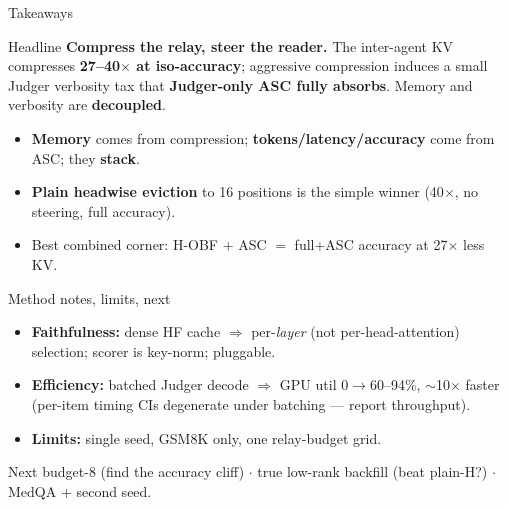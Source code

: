 \documentclass{beamer}
\begin{document}
\begin{frame}{Takeaways}
    \begin{block}{Headline}
        \textbf{Compress the relay, steer the reader.} The inter-agent KV compresses \textbf{27--40$\times$ at iso-accuracy}; aggressive compression induces a small Judger verbosity tax that \textbf{Judger-only ASC fully absorbs}. Memory and verbosity are \textbf{decoupled}.
    \end{block}
    \begin{itemize}
        \item \textbf{Memory} comes from compression; \textbf{tokens/latency/accuracy} come from ASC; they \textbf{stack}.
        \item \textbf{Plain headwise eviction} to 16 positions is the simple winner (40$\times$, no steering, full accuracy).
        \item Best combined corner: H-OBF + ASC $=$ full+ASC accuracy at 27$\times$ less KV.
    \end{itemize}
\end{frame}

\begin{frame}{Method notes, limits, next}
    \begin{itemize}
        \item \textbf{Faithfulness:} dense HF cache $\Rightarrow$ per-\emph{layer} (not per-head-attention) selection; scorer is key-norm; pluggable.
        \item \textbf{Efficiency:} batched Judger decode $\Rightarrow$ GPU util $0 \to 60$--94\%, $\sim$10$\times$ faster (per-item timing CIs degenerate under batching --- report throughput).
        \item \textbf{Limits:} single seed, GSM8K only, one relay-budget grid.
    \end{itemize}
    \vspace{0.2cm}
    \begin{block}{Next}
        budget-8 (find the accuracy cliff) $\cdot$ true low-rank backfill (beat plain-H?) $\cdot$ MedQA + second seed.
    \end{block}
\end{frame}
\end{document}

